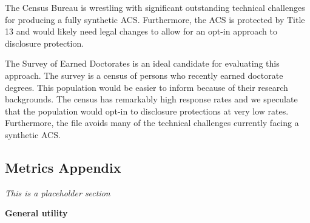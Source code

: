 \documentclass[
]{urban-formatting}
\begin{document}
The Census Bureau is wrestling with significant outstanding technical
challenges for producing a fully synthetic ACS. Furthermore, the ACS is
protected by Title 13 and would likely need legal changes to allow for
an opt-in approach to disclosure protection.

The Survey of Earned Doctorates is an ideal candidate for evaluating
this approach. The survey is a census of persons who recently earned
doctorate degrees. This population would be easier to inform because of
their research backgrounds. The census has remarkably high response
rates and we speculate that the population would opt-in to disclosure
protections at very low rates. Furthermore, the file avoids many of the
technical challenges currently facing a synthetic ACS.

\subsection{Metrics Appendix}

\emph{This is a placeholder section}

\textbf{General utility}
\end{document}
